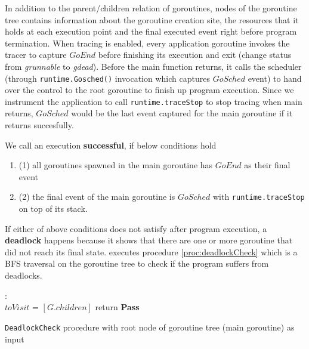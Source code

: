 %
In addition to the parent/children relation of goroutines, nodes of the goroutine tree contains information about the goroutine creation site, the resources that it holds at each execution point and the final executed event right before program termination.
%
When tracing is enabled, every application goroutine invokes the tracer to capture $GoEnd$ before finishing its execution and exit (\ie change status from \textit{grunnable} to \textit{gdead}\cite{goexit-line-of-code}).
%
Before the main function returns, it calls the scheduler (through \texttt{runtime.Gosched()} invocation which captures $GoSched$ event) to hand over the control to the root goroutine to finish up program execution.
%
Since we instrument the application to call \texttt{runtime.traceStop} to stop tracing when main returns, $GoSched$ would be the last event captured for the main goroutine if it returns succesfully.
%

We call an execution \textbf{successful}, if below conditions hold
\begin{enumerate}
  \item (1) all goroutines spawned in the main goroutine has $GoEnd$ as their final event
  \item (2) the final event of the main goroutine is $GoSched$ with \texttt{runtime.traceStop} on top of its stack.
\end{enumerate}
If either of above conditions does not satisfy after program execution, a \textbf{deadlock} happens because it shows that there are one or more goroutine that did not reach its final state. \goat executes procedure \ref{proc:deadlockCheck} which is a BFS traversal on the goroutine tree to check if the program suffers from deadlocks.

\begin{small}
\begin{algorithm}[]
 \DontPrintSemicolon
 :{\\
 \Indp
    $toVisit$ = $[G.children]$\;
      return \textbf{Pass}\;
  }
 \caption{\texttt{DeadlockCheck} procedure with root node of goroutine tree (main goroutine) as input}
 \label{proc:deadlockCheck}
\end{algorithm}
\end{small}



